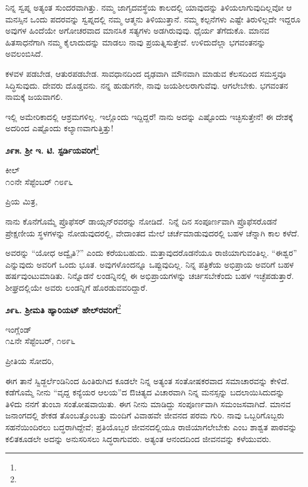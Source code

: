 ನಿನ್ನ ಸ್ವಪ್ನ ಅತ್ಯಂತ ಸುಂದರವಾಗಿತ್ತು. ನಮ್ಮ ಜಾಗೃದವಸ್ಥೆಯ ಕಾಲದಲ್ಲಿ ಯಾವುದನ್ನು ತಿಳಿಯಲಾಗುವುದಿಲ್ಲವೋ ಆ ಮನಸ್ಸಿನ ಒಂದು ಪದರವನ್ನು ಸ್ವಪ್ನದಲ್ಲಿ ನಮ್ಮ ಆತ್ಮನು ತಿಳಿಯುತ್ತಾನೆ. ನಮ್ಮ ಕಲ್ಪನೆಗಳು ಎಷ್ಟೇ ತಿರುಳಿಲ್ಲದೇ ಇದ್ದರೂ ಅವುಗಳ ಹಿಂದೆಯೇ ಅಗೋಚರವಾದ ಮಾನಸಿಕ ಸತ್ಯಗಳು ಅಡಗಿರುವುವು. ಧೈರ್ಯ ತೆಗೆದುಕೊ. ಮಾನವ ಹಿತಸಾಧನೆಗಾಗಿ ನಮ್ಮ ಕೈಲಾದುದನ್ನು ಮಾಡಲು ನಾವು ಪ್ರಯತ್ನಿಸುತ್ತೇವೆ. ಉಳಿದುದೆಲ್ಲಾ ಭಗವಂತನನ್ನು ಅವಲಂಬಿಸಿದೆ.

ಕಳವಳ ಪಡಬೇಡ, ಆತುರಪಡಬೇಡ. ಸಾವಧಾನದಿಂದ ದೃಢವಾಗಿ ಮೌನವಾಗಿ ಮಾಡುವ ಕೆಲಸದಿಂದ ಸಮಸ್ತವೂ ಸಿದ್ಧಿಸುವುದು. ದೇವರು ದೊಡ್ಡವನು. ನನ್ನ ಹುಡುಗನೇ, ನಾವು ಜಯಶೀಲರಾಗುವೆವು. ಆಗಲೇಬೇಕು. ಭಗವಂತನ ನಾಮಕ್ಕೆ ಜಯವಾಗಲಿ.

ಇಲ್ಲಿ ಅಮೇರಿಕಾದಲ್ಲಿ ಆಶ್ರಮಗಳಿಲ್ಲ. ಇಲ್ಲೊಂದು ಇದ್ದಿದ್ದರೆ! ನಾನು ಅದನ್ನು ಎಷ್ಟೊಂದು ಇಚ್ಛಿಸುತ್ತೇನೆ! ಈ ದೇಶಕ್ಕೆ ಅದರಿಂದ ಎಷ್ಟೊಂದು ಕಲ್ಯಾಣವಾಗುತ್ತಿತ್ತು!
\vspace{-0.2cm}

\begin{center}
\textbf{೨೯೫. ಶ‍್ರೀ ಇ. ಟಿ. ಸ್ಟರ್ಡಿಯವರಿಗೆ}\footnote{}
\end{center}
\vspace{-0.5cm}

\begin{flushright}
ಕೀಲ್\\೧೦ನೇ ಸೆಪ್ಟೆಂಬರ್ ೧೮೯೬
\end{flushright}
\vspace{-0.4cm}

\noindent
ಪ್ರಿಯ ಮಿತ್ರ,

ನಾನು ಕೊನೆಗೊಮ್ಮೆ ಪ್ರೊಫೆಸರ್ ಡಾಯ್ಸನ್‌ರವರನ್ನು ನೋಡಿದೆ.~ನಿನ್ನೆ ದಿನ ಸಂಪೂರ್ಣವಾಗಿ ಪ್ರೊಫೆಸರೊಡನೆ ಪ್ರೇಕ್ಷಣೀಯ ಸ್ಥಳಗಳನ್ನು ನೋಡುವುದರಲ್ಲಿ, ವೇದಾಂತದ ಮೇಲೆ ಚರ್ಚೆಮಾಡುವುದರಲ್ಲಿ ಬಹಳ ಚೆನ್ನಾಗಿ ಕಾಲ ಕಳೆದೆ.

ಅವರನ್ನು “ಯೋಧ ಅದ್ವೈತಿ?” ಎಂದು ಕರೆಯಬಹುದು. ಮತ್ತಾವುದರೊಡನೆಯೂ ರಾಜಿಯಾಗುವಂತಿಲ್ಲ. “ಈಶ್ವರ” ಎನ್ನುವುದು ಅವರಿಗೆ ಒಂದು ಭೂತ. ಅವುಗಳೊಂದನ್ನೂ ಒಪ್ಪುವುದಿಲ್ಲ. ನಿನ್ನ ಪತ್ರಿಕೆಯ ಅಭಿಪ್ರಾಯ ಅವರಿಗೆ ಬಹಳ ಹರ್ಷವುಂಟುಮಾಡಿತು. ನಿನ್ನೊಡನೆ ಲಂಡನ್ನಿನಲ್ಲಿ ಈ ಅಭಿಪ್ರಾಯಗಳನ್ನು ಚರ್ಚಿಸಬೇಕೆಂದು ಬಹಳ ಇಚ್ಛೆಪಡುತ್ತಾರೆ. ಶೀಘ್ರದಲ್ಲಿಯೇ ಅವರು ಲಂಡನ್ನಿಗೆ ಹೊರಡುವವರಿದ್ದಾರೆ.

\begin{center}
\textbf{೨೯೬. ಶ‍್ರೀಮತಿ ಹ್ಯಾರಿಯಟ್ ಹೇಲ್‌ರವರಿಗೆ}\footnote{}
\end{center}

\begin{flushright}
ಇಂಗ್ಲೆಂಡ್\\೧೭ನೇ ಸೆಪ್ಟೆಂಬರ್, ೧೮೯೬
\end{flushright}

\noindent
ಪ್ರೀತಿಯ ಸೋದರಿ,

ಈಗ ತಾನೆ ಸ್ವಿಡ್ಜರ್ಲೆಂಡಿನಿಂದ ಹಿಂತಿರುಗಿದ ಕೂಡಲೇ ನಿನ್ನ ಅತ್ಯಂತ ಸಂತೋಷಕರವಾದ ಸಮಾಚಾರವನ್ನು ಕೇಳಿದೆ. ಕಡೆಗೊಮ್ಮೆ ನೀನು “ವೃದ್ದ ಕನ್ಯೆಯರ ಆಲಯ”ದ ಔಚಿತ್ಯದ ವಿಚಾರವಾಗಿ ನಿನ್ನ ಮನಸ್ಸನ್ನು ಬದಲಾಯಿಸಿದುದನ್ನು ತಿಳಿದು ನನಗೆ ತುಂಬಾ ಸಂತೋಷವಾಯಿತು. ಈಗ ನೀನು ಮಾಡಿದ್ದು ಸಂಪೂರ್ಣವಾಗಿ ಸಮಂಜಸವಾಗಿದೆ. ಮಾನವ ಜನಾಂಗದಲ್ಲಿ ಶೇಕಡ ತೊಂಬತ್ತೊಂಬತ್ತು ಮಂದಿಗೆ ವಿವಾಹವೇ ಜೀವನದ ಪರಮ ಗುರಿ. ನಾವು ಒಬ್ಬರಿಗೊಬ್ಬರು ಸಹನೆಯಿಂದಿರಲು ಬದ್ಧರಾಗಿದ್ದೇವೆ; ಪ್ರತಿಯೊಬ್ಬರ ಜೀವನದಲ್ಲಿಯೂ ರಾಜಿಯಾಗಲೇಬೇಕು\enginline{-} ಎಂಬ ಶಾಶ್ವತ ಪಾಠವನ್ನು ಕಲಿತಕೂಡಲೇ ಅದನ್ನು ಅನುಸರಿಸಲು ಸಿದ್ಧರಾಗುವರು. ಅತ್ಯಂತ ಆನಂದದಿಂದ ಜೀವನವನ್ನು ಕಳೆಯುವರು.

